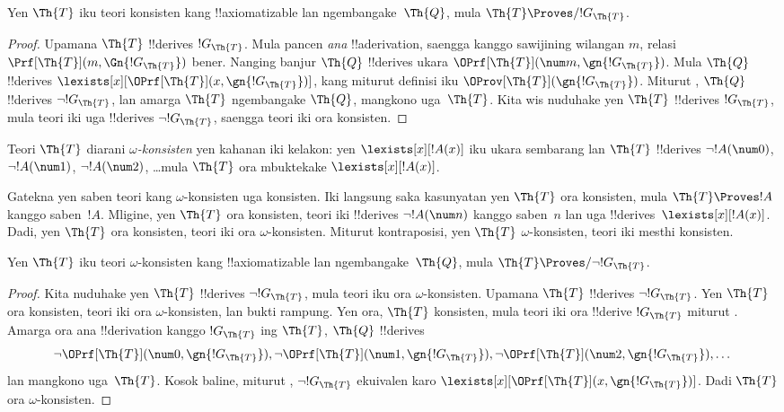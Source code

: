 \documentclass[../../../include/open-logic-section]{subfiles}
\begin{document}
\begin{lem}
Yen $\Th{T}$ iku teori konsisten kang !!{axiomatizable} lan
ngembangake~$\Th{Q}$, mula $\Th{T} \Proves/ !G_\Th{T}$.
\end{lem}

\begin{proof}
Upamana $\Th{T}$ !!{derive}s $!G_\Th{T}$. Mula pancen \emph{ana}
!!a{derivation}, saengga kanggo sawijining wilangan $m$, relasi
$\Prf[\Th{T}](m,\Gn{!G_\Th{T}})$ bener. Nanging banjur $\Th{Q}$
!!{derive}s ukara $\OPrf[\Th{T}](\num m, \gn{!G_\Th{T}})$. Mula
$\Th{Q}$ !!{derive}s
$\lexists[x][\OPrf[\Th{T}](x,\gn{!G_\Th{T}})]$, kang miturut definisi
iku $\OProv[\Th{T}](\gn{!G_\Th{T}})$. Miturut ,
$\Th{Q}$ !!{derive}s $\lnot !G_\Th{T}$, lan amarga $\Th{T}$
ngembangake $\Th{Q}$, mangkono uga~$\Th{T}$. Kita wis nuduhake yen
$\Th{T}$ !!{derive}s $!G_\Th{T}$, mula teori iki uga !!{derive}s
$\lnot !G_\Th{T}$, saengga teori iki ora konsisten.
\end{proof}

\begin{defn}
Teori $\Th{T}$ diarani \emph{$\omega$-konsisten} yen kahanan iki
kelakon: yen $\lexists[x][!A(x)]$ iku ukara sembarang lan $\Th{T}$
!!{derive}s $\lnot !A(\num 0)$, $\lnot !A(\num 1)$,
$\lnot !A(\num 2)$, \dots mula $\Th{T}$ ora mbuktekake
$\lexists[x][!A(x)]$.
\end{defn}

Gatekna yen saben teori kang $\omega$-konsisten uga konsisten. Iki
langsung saka kasunyatan yen $\Th{T}$ ora konsisten, mula
$\Th{T} \Proves !A$ kanggo saben~$!A$. Mligine, yen $\Th{T}$ ora
konsisten, teori iki !!{derive}s $\lnot !A(\num n)$ kanggo saben~$n$
lan uga !!{derive}s~$\lexists[x][!A(x)]$. Dadi, yen $\Th{T}$ ora
konsisten, teori iki ora $\omega$-konsisten. Miturut kontraposisi, yen
$\Th{T}$ $\omega$-konsisten, teori iki mesthi konsisten.

\begin{lem}
Yen $\Th{T}$ iku teori $\omega$-konsisten kang !!{axiomatizable}
lan ngembangake~$\Th{Q}$, mula $\Th{T} \Proves/ \lnot !G_\Th{T}$.
\end{lem}

\begin{proof}
Kita nuduhake yen $\Th{T}$ !!{derive}s $\lnot !G_\Th{T}$, mula
teori iku ora $\omega$-konsisten. Upamana $\Th{T}$ !!{derive}s
$\lnot !G_\Th{T}$. Yen $\Th{T}$ ora konsisten, teori iki
ora $\omega$-konsisten, lan bukti rampung. Yen ora, $\Th{T}$
konsisten, mula teori iki ora !!{derive} $!G_\Th{T}$ miturut
. Amarga ora ana !!{derivation} kanggo
$!G_\Th{T}$ ing $\Th{T}$, $\Th{Q}$ !!{derive}s
\[
\lnot \OPrf[\Th{T}](\num 0, \gn{!G_\Th{T}}), \lnot \OPrf[\Th{T}](\num 1,
\gn{!G_\Th{T}}), \lnot \OPrf[\Th{T}](\num 2, \gn{!G_\Th{T}}), \dots
\]
lan mangkono uga~$\Th{T}$. Kosok baline, miturut ,
$\lnot !G_\Th{T}$ ekuivalen karo
$\lexists[x][\OPrf[\Th{T}](x,\gn{!G_\Th{T}})]$. Dadi $\Th{T}$
ora $\omega$-konsisten.
\end{proof}
\end{document}
